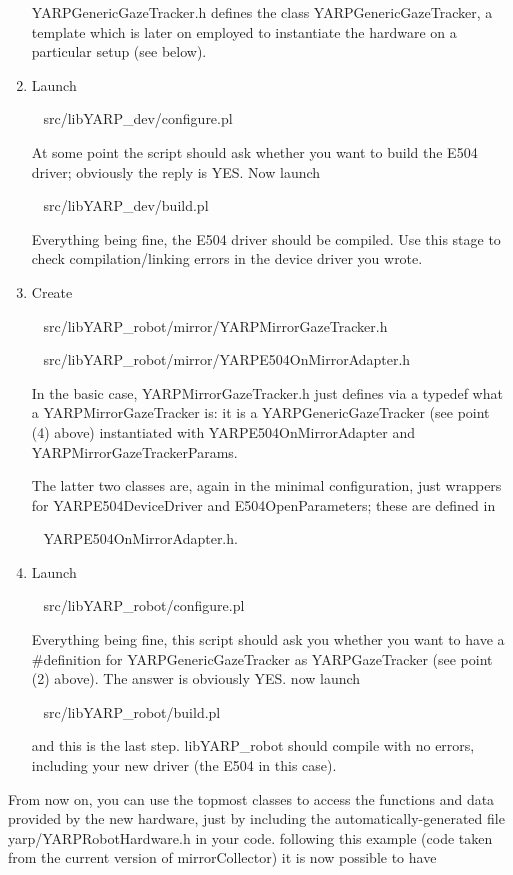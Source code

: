 \begin{enumerate}
	YARPGenericGazeTracker.h defines the class YARPGenericGazeTracker,
	a template which is later on employed to instantiate the hardware
	on a particular setup (see below).

  \item Launch

	~	src/libYARP\_dev/configure.pl

	At some point the script should ask whether you want to build the
	E504 driver; obviously the reply is YES. Now launch

	~	src/libYARP\_dev/build.pl

	Everything being fine, the E504 driver should be compiled. Use this
	stage to check compilation/linking errors in the device driver you
	wrote.

  \item Create

	~	src/libYARP\_robot/mirror/YARPMirrorGazeTracker.h

	~	src/libYARP\_robot/mirror/YARPE504OnMirrorAdapter.h

	In the basic case, YARPMirrorGazeTracker.h just defines via a typedef
	what a YARPMirrorGazeTracker is: it is a YARPGenericGazeTracker
	(see point (4) above) instantiated with YARPE504OnMirrorAdapter and
	YARPMirrorGazeTrackerParams.

	The latter two classes are, again in the minimal configuration, just
	wrappers for YARPE504DeviceDriver and E504OpenParameters; these are
	defined in

        ~       YARPE504OnMirrorAdapter.h.

  \item Launch

	~	src/libYARP\_robot/configure.pl

	Everything being fine, this script should ask you whether you want to
	have a \#definition for YARPGenericGazeTracker as YARPGazeTracker (see
	point (2) above). The answer is obviously YES. now launch

	~	src/libYARP\_robot/build.pl

	and this is the last step. libYARP\_robot should compile with no
	errors, including your new driver (the E504 in this case).

\end{enumerate}

From now on, you can use the topmost classes to access the functions
and data provided by the new hardware, just by including the
automatically-generated file yarp/YARPRobotHardware.h in your
code. following this example (code taken from the current version of
mirrorCollector) it is now possible to have

